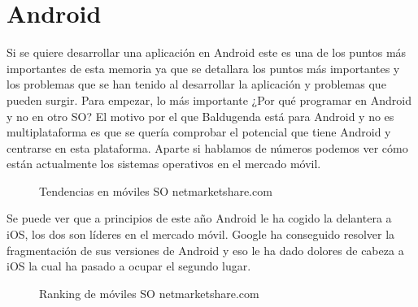\section{Android}
\label{secc:android}
Si se quiere desarrollar una aplicación en Android este es una de los puntos más importantes de esta memoria ya que se detallara los puntos más importantes y los problemas que se han tenido al desarrollar la aplicación y problemas que pueden surgir.
Para empezar, lo más importante ¿Por qué programar en Android y no en otro SO?
El motivo por el que Baldugenda está para Android  y no es multiplataforma es que se quería 
comprobar el potencial que tiene Android y centrarse en esta plataforma.
Aparte si hablamos de números podemos ver cómo están actualmente los sistemas operativos en el mercado móvil.

\begin{figure}[H] 
  \begin{center} 
    \caption{Tendencias en móviles SO netmarketshare.com} 
    \label{fig:TendenciasSO} 
  \end{center} 
\end{figure}

Se puede ver que a principios de este año Android le ha cogido la delantera a iOS, los dos son líderes en el mercado móvil.
Google ha conseguido resolver la fragmentación de sus versiones de Android y eso le ha dado dolores de cabeza a iOS la cual ha pasado a ocupar el segundo lugar.
\newpage
\begin{figure}[H] 
  \begin{center} 
    \caption{Ranking de móviles SO netmarketshare.com} 
    \label{fig:RankingSO} 
  \end{center} 
\end{figure}

